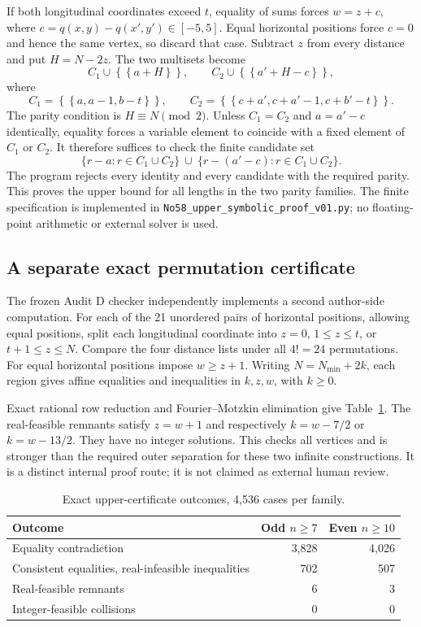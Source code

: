 \documentclass[11pt,a4paper]{article}
\newcommand{\ms}[1]{\left\{\!\left\{#1\right\}\!\right\}}
\newcommand{\code}[1]{{\small\nolinkurl{#1}}}
\begin{document}
If both longitudinal coordinates exceed $t$, equality of sums forces $w=z+c$, where $c=q(x,y)-q(x',y')\in[-5,5]$. Equal horizontal positions force $c=0$ and hence the same vertex, so discard that case. Subtract $z$ from every distance and put $H=N-2z$. The two multisets become
\[
C_1\cup\ms{a+H},\qquad C_2\cup\ms{a'+H-c},
\]
where
\[
C_1=\ms{a,a-1,b-t},\qquad
C_2=\ms{c+a',c+a'-1,c+b'-t}.
\]
The parity condition is $H\equiv N\pmod2$. Unless $C_1=C_2$ and $a=a'-c$ identically, equality forces a variable element to coincide with a fixed element of $C_1$ or $C_2$. It therefore suffices to check the finite candidate set
\[
\{r-a:r\in C_1\cup C_2\}\ \cup\
\{r-(a'-c):r\in C_1\cup C_2\}.
\]
The program rejects every identity and every candidate with the required parity. This proves the upper bound for all lengths in the two parity families. The finite specification is implemented in \code{No58_upper_symbolic_proof_v01.py}; no floating-point arithmetic or external solver is used.

\subsection{A separate exact permutation certificate}
The frozen Audit D checker independently implements a second author-side computation. For each of the 21 unordered pairs of horizontal positions, allowing equal positions, split each longitudinal coordinate into $z=0$, $1\le z\le t$, or $t+1\le z\le N$. Compare the four distance lists under all $4!=24$ permutations. For equal horizontal positions impose $w\ge z+1$. Writing $N=N_{\min}+2k$, each region gives affine equalities and inequalities in $k,z,w$, with $k\ge0$.

Exact rational row reduction and Fourier--Motzkin elimination give Table~\ref{tab:upper}. The real-feasible remnants satisfy $z=w+1$ and respectively $k=w-7/2$ or $k=w-13/2$. They have no integer solutions. This checks all vertices and is stronger than the required outer separation for these two infinite constructions. It is a distinct internal proof route; it is not claimed as external human review.

\begin{table}[ht]\centering\small
\caption{Exact upper-certificate outcomes, 4,536 cases per family.}\label{tab:upper}
\begin{tabular}{@{}lrr@{}}\toprule
Outcome & Odd $n\ge7$ & Even $n\ge10$\\\midrule
Equality contradiction & 3,828 & 4,026\\
Consistent equalities, real-infeasible inequalities & 702 & 507\\
Real-feasible remnants & 6 & 3\\
Integer-feasible collisions & 0 & 0\\\bottomrule
\end{tabular}
\end{table}
\end{document}
